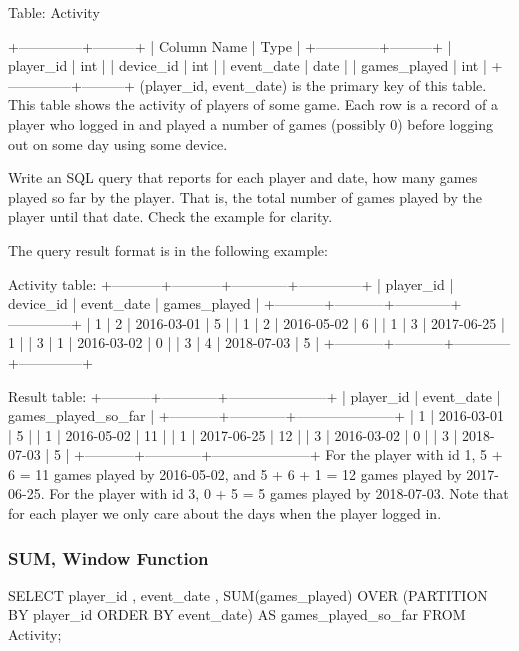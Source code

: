 Table: Activity

\begin{Code}
+--------------+---------+
| Column Name  | Type    |
+--------------+---------+
| player_id    | int     |
| device_id    | int     |
| event_date   | date    |
| games_played | int     |
+--------------+---------+
(player_id, event_date) is the primary key of this table.
This table shows the activity of players of some game.
Each row is a record of a player who logged in and played a number of games (possibly 0)
before logging out on some day using some device.
\end{Code}

Write an SQL query that reports for each player and date, how many games played so far by the player. That is, the total number of games played by the player until that date. Check the example for clarity.

The query result format is in the following example:

\begin{Code}
Activity table:
+-----------+-----------+------------+--------------+
| player_id | device_id | event_date | games_played |
+-----------+-----------+------------+--------------+
| 1         | 2         | 2016-03-01 | 5            |
| 1         | 2         | 2016-05-02 | 6            |
| 1         | 3         | 2017-06-25 | 1            |
| 3         | 1         | 2016-03-02 | 0            |
| 3         | 4         | 2018-07-03 | 5            |
+-----------+-----------+------------+--------------+

Result table:
+-----------+------------+---------------------+
| player_id | event_date | games_played_so_far |
+-----------+------------+---------------------+
| 1         | 2016-03-01 | 5                   |
| 1         | 2016-05-02 | 11                  |
| 1         | 2017-06-25 | 12                  |
| 3         | 2016-03-02 | 0                   |
| 3         | 2018-07-03 | 5                   |
+-----------+------------+---------------------+
For the player with id 1, 5 + 6 = 11 games played by 2016-05-02,
and 5 + 6 + 1 = 12 games played by 2017-06-25.
For the player with id 3, 0 + 5 = 5 games played by 2018-07-03.
Note that for each player we only care about the days when the player logged in.
\end{Code}


\subsubsection{SUM, Window Function}
\begin{Code}
SELECT
    player_id
    , event_date
    , SUM(games_played) OVER
        (PARTITION BY player_id ORDER BY event_date) AS games_played_so_far
FROM
    Activity;
\end{Code}


